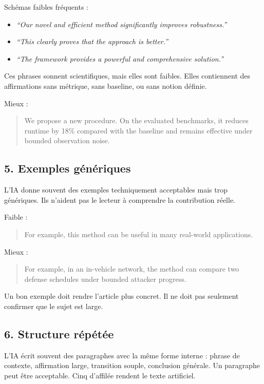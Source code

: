 \documentclass[11pt,a4paper]{article}
\theoremstyle{definition}
\begin{document}
Schémas faibles fréquents :
\begin{itemize}
    \item \textit{``Our novel and efficient method significantly improves robustness.''}
    \item \textit{``This clearly proves that the approach is better.''}
    \item \textit{``The framework provides a powerful and comprehensive solution.''}
\end{itemize}

Ces phrases sonnent scientifiques, mais elles sont faibles. Elles contiennent des affirmations sans métrique, sans baseline, ou sans notion définie.

Mieux :
\begin{quote}
We propose a new procedure. On the evaluated benchmarks, it reduces runtime by 18\% compared with the baseline and remains effective under bounded observation noise.
\end{quote}

\subsection*{5. Exemples génériques}

L'IA donne souvent des exemples techniquement acceptables mais trop génériques. Ils n'aident pas le lecteur à comprendre la contribution réelle.

Faible :
\begin{quote}
For example, this method can be useful in many real-world applications.
\end{quote}

Mieux :
\begin{quote}
For example, in an in-vehicle network, the method can compare two defense schedules under bounded attacker progress.
\end{quote}

Un bon exemple doit rendre l'article plus concret. Il ne doit pas seulement confirmer que le sujet est large.

\subsection*{6. Structure répétée}

L'IA écrit souvent des paragraphes avec la même forme interne :
phrase de contexte, affirmation large, transition souple, conclusion générale.
Un paragraphe peut être acceptable. Cinq d'affilée rendent le texte artificiel.
\end{document}
